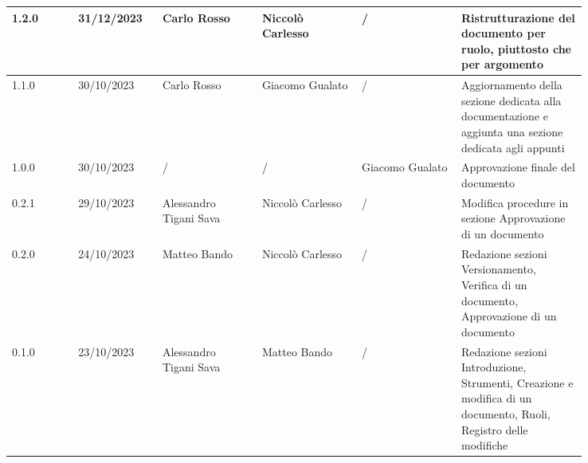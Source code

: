 {\begin{tabular}{p{0.10\linewidth}p{0.10\linewidth}p{0.15\linewidth}p{0.15\linewidth}p{0.15\linewidth}p{0.19\linewidth}}
	  \hline
	  1.2.0             & 31/12/2023    & Carlo Rosso            & Niccolò Carlesso      & /                    & Ristrutturazione del documento per ruolo, piuttosto che per argomento                                                                    \\
	  \hline
	  1.1.0             & 30/10/2023    & Carlo Rosso            & Giacomo Gualato       & /                    & Aggiornamento della sezione dedicata alla documentazione e aggiunta una sezione dedicata agli appunti                                    \\
	  \hline
	  1.0.0             & 30/10/2023    & /                      & /                     & Giacomo Gualato      & Approvazione finale del documento                                                                                                        \\
	  \hline
	  0.2.1             & 29/10/2023    & Alessandro Tigani Sava & Niccolò Carlesso      & /                    & Modifica procedure in sezione Approvazione di un documento                                                                               \\
	  \hline
	  0.2.0             & 24/10/2023    & Matteo Bando           & Niccolò Carlesso      & /                    & Redazione sezioni Versionamento, Verifica di un documento, Approvazione di un documento                                                  \\
	  \hline
	  0.1.0             & 23/10/2023    & Alessandro Tigani Sava & Matteo Bando          & /                    & Redazione sezioni Introduzione, Strumenti, Creazione e modifica di un documento, Ruoli, Registro delle modifiche                         \\
	  \hline
  \end{tabular}
 }
